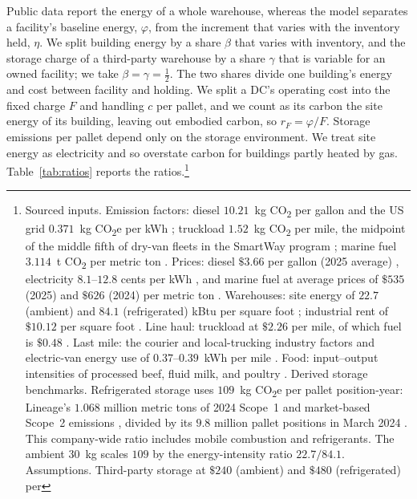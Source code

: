 \documentclass[11pt]{article}
\numberwithin{proposition}{section}
\theoremstyle{definition}
\theoremstyle{remark}
\theoremstyle{plain}
\begin{document}
Public data report the energy of a whole warehouse, whereas the model separates a facility's baseline energy,
$\varphi$, from the increment that varies with the inventory held, $\eta$. We split building energy by a share
$\beta$ that varies with inventory, and the storage charge of a third-party warehouse by a share $\gamma$ that is
variable for an owned facility; we take $\beta=\gamma=\tfrac12$. The two shares divide one building's energy and
cost between facility and holding. We split a DC's operating cost into the fixed charge $F$ and handling $c$ per pallet, and we count as its
carbon the site energy of its building, leaving out embodied carbon, so $r_F=\varphi/F$. Storage emissions per pallet depend only on
the storage environment. We treat site energy as electricity and so overstate carbon for buildings partly heated
by gas. Table~\ref{tab:ratios} reports the ratios.\footnote{Sourced inputs.
Emission factors: diesel $10.21$~kg CO\textsubscript{2} per gallon and the US grid $0.371$~kg
CO\textsubscript{2}e per kWh \citep{epa2022ghghub}; truckload $1.52$~kg CO\textsubscript{2} per mile, the
midpoint of the middle fifth of dry-van fleets in the SmartWay program \citep{epa2024smartway}; marine fuel
$3.114$~t CO\textsubscript{2} per metric ton \citep{eu2016mrv}. Prices: diesel $\$3.66$ per gallon (2025
average) \citep{eia2026diesel}, electricity $8.1$--$12.8$ cents per kWh \citep{eia2025electricity}, and marine
fuel at average prices of $\$535$ (2025) and $\$626$ (2024) per metric ton \citep{shipbunker2026}. Warehouses: site
energy of $22.7$ (ambient) and $84.1$ (refrigerated) kBtu per square foot \citep{energystar2024medians};
industrial rent of $\$10.12$ per square foot \citep{cushman2025industrial}. Line
haul: truckload at $\$2.26$ per mile, of which fuel is $\$0.48$ \citep{atri2025costs}. Last mile: the courier and
local-trucking industry factors \citep{epa2024useeio} and electric-van energy use of $0.37$--$0.39$~kWh per mile
\citep{mulholland2022vans}. Food: input--output intensities of processed beef, fluid milk, and poultry
\citep{epa2024useeio}. Derived storage benchmarks. Refrigerated storage uses $109$~kg CO\textsubscript{2}e per
pallet position-year: Lineage's $1.068$ million metric tons of 2024 Scope~1 and market-based Scope~2 emissions
\citep{lineage2025sustainability}, divided by its $9.8$ million pallet positions in March 2024
\citep{lineage2024prospectus}. This company-wide ratio includes mobile combustion and refrigerants. The ambient $30$~kg scales $109$ by the energy-intensity ratio $22.7/84.1$. Assumptions. Third-party storage at $\$240$ (ambient) and $\$480$ (refrigerated) per
}
\end{document}
